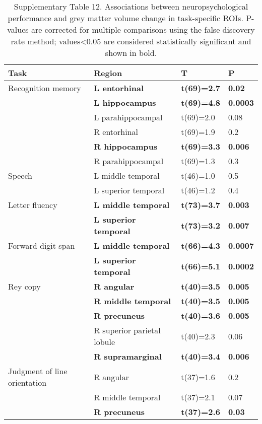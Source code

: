 \documentclass[]{article}
\begin{document}
\begin{table}[ht]
\centering
\caption{Supplementary Table 12. Associations between neuropsychological performance and grey matter volume change in task-specific ROIs. P-values are corrected for multiple comparisons using the false discovery rate method; values<0.05 are considered statistically significant and shown in bold.} 
\begin{tabular}{llll}
  \hline
Task & Region & T & P \\ 
  \hline
Recognition memory & \textbf{L entorhinal} & \textbf{t(69)=2.7} & \textbf{0.02} \\ 
   & \textbf{L hippocampus} & \textbf{t(69)=4.8} & \textbf{0.0003} \\ 
   & L parahippocampal & t(69)=2.0 & 0.08 \\ 
   & R entorhinal & t(69)=1.9 & 0.2 \\ 
   & \textbf{R hippocampus} & \textbf{t(69)=3.3} & \textbf{0.006} \\ 
   & R parahippocampal & t(69)=1.3 & 0.3 \\ 
  Speech & L middle temporal & t(46)=1.0 & 0.5 \\ 
   & L superior temporal & t(46)=1.2 & 0.4 \\ 
  Letter fluency & \textbf{L middle temporal} & \textbf{t(73)=3.7} & \textbf{0.003} \\ 
   & \textbf{L superior temporal} & \textbf{t(73)=3.2} & \textbf{0.007} \\ 
  Forward digit span & \textbf{L middle temporal} & \textbf{t(66)=4.3} & \textbf{0.0007} \\ 
   & \textbf{L superior temporal} & \textbf{t(66)=5.1} & \textbf{0.0002} \\ 
  Rey copy & \textbf{R angular} & \textbf{t(40)=3.5} & \textbf{0.005} \\ 
   & \textbf{R middle temporal} & \textbf{t(40)=3.5} & \textbf{0.005} \\ 
   & \textbf{R precuneus} & \textbf{t(40)=3.6} & \textbf{0.005} \\ 
   & R superior parietal lobule & t(40)=2.3 & 0.06 \\ 
   & \textbf{R supramarginal} & \textbf{t(40)=3.4} & \textbf{0.006} \\ 
  Judgment of line orientation & R angular & t(37)=1.6 & 0.2 \\ 
   & R middle temporal & t(37)=2.1 & 0.07 \\ 
   & \textbf{R precuneus} & \textbf{t(37)=2.6} & \textbf{0.03} \\ 

\end{tabular}
\end{table}
\end{document}
